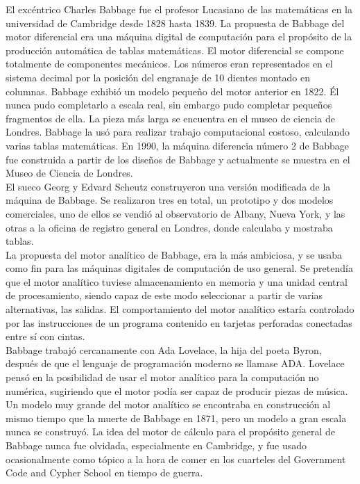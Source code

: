 \documentclass[a4paper]{article}
\begin{document}
    El excéntrico Charles Babbage fue el profesor Lucasiano de las matemáticas en la universidad de Cambridge desde 1828 hasta 1839. La propuesta de Babbage del motor diferencial era una máquina digital de computación para el propósito de la producción automática de tablas matemáticas. El motor diferencial se compone totalmente de componentes mecánicos. Los números eran representados en el sistema decimal por la posición del engranaje de 10 dientes montado en columnas. Babbage exhibió un modelo pequeño del motor anterior en 1822. Él nunca pudo completarlo a escala real, sin embargo pudo completar pequeños fragmentos de ella. La pieza más larga se encuentra en el museo de ciencia de Londres. Babbage la usó para realizar trabajo computacional costoso, calculando varias tablas matemáticas. En 1990, la máquina diferencia número 2 de Babbage fue construida a partir de los diseños de Babbage y actualmente se muestra en el Museo de Ciencia de Londres.\\

    El sueco Georg y Edvard Scheutz construyeron una versión modificada de la máquina de Babbage. Se realizaron tres en total, un prototipo y dos modelos comerciales, uno de ellos se vendió al observatorio de Albany, Nueva York, y las otras a la oficina de registro general en Londres, donde calculaba y mostraba tablas.\\

    La propuesta del motor analítico de Babbage, era la más ambiciosa, y se usaba como fin para las máquinas digitales de computación de uso general. Se pretendía que el motor analítico tuviese almacenamiento en memoria y una unidad central de procesamiento, siendo capaz de este modo seleccionar a partir de varias alternativas, las salidas. El comportamiento del motor analítico estaría controlado por las instrucciones de un programa contenido en tarjetas perforadas conectadas entre sí con cintas.\\

    Babbage trabajó cercanamente con Ada Lovelace, la hija del poeta Byron, después de que el lenguaje de programación moderno se llamase ADA. Lovelace  pensó en la posibilidad de usar el motor analítico para la computación no numérica, sugiriendo que el motor podía ser capaz de producir piezas de música.\\

    Un modelo muy grande del motor analítico se encontraba en construcción al mismo tiempo que la muerte de Babbage en 1871, pero un modelo a gran escala nunca se construyó. La idea del motor de cálculo para el propósito general de Babbage nunca fue olvidada, especialmente en Cambridge, y fue usado ocasionalmente como tópico a la hora de comer en los cuarteles del Government Code and Cypher School en tiempo de guerra.
\end{document}
